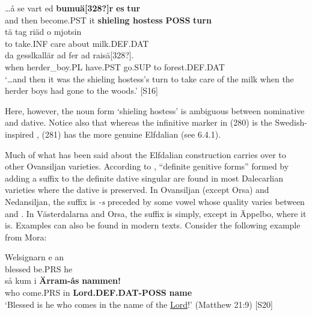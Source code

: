 
\ea\label{}
\gll …å  se  vart  ed  \textbf{bumuä[328?]r} \textbf{es} \textbf{tur}\\
and  then  become.PST  it  \textbf{shieling hostess} \textbf{POSS} \textbf{turn}\\
\gll tä  tag  riäd   o  mjotsin\\
to  take.INF  care  about  milk.DEF.DAT\\
\gll da  gesslkallär  ad  fer  ad  raisä[328?].\\
when  herder\_boy.PL  have.PST  go.SUP  to  forest.DEF.DAT\\
\glt ‘…and then it was the shieling hostess’s turn to take care of the milk when the herder boys had gone to the woods.’ [S16]
\z

Here, however, the noun form  ‘shieling hostess’ is ambiguous between nominative and dative. Notice also that whereas the infinitive marker in (280) is the Swedish-inspired , (281) has the more genuine Elfdalian  (see 6.4.1). 


Much of what has been said about the Elfdalian construction carries over to other Ovansiljan varieties. According to \citet[170]{Levander1928}, “definite genitive forms” formed by adding a suffix to the definite dative singular are found in most Dalecarlian varieties where the dative is preserved. In Ovansiljan (except Orsa) and Nedansiljan, the suffix is\textit{ {}-s} preceded by some vowel whose quality varies between  and . In Västerdalarna and Orsa, the suffix is simply, except in Äppelbo, where it is. Examples can also be found in modern texts. Consider the following example from Mora:


\ea\label{}
\gll Welsignarn  e  an\\
blessed  be.PRS  he\\
\gll så  kum  i  \textbf{Ärram-ås} \textbf{nammen!}\\
who  come.PRS  in  \textbf{Lord.DEF.DAT-POSS} \textbf{name}\\
\glt ‘Blessed is he who comes in the name of the \href{http://www.godrules.net/library/topics/topic1192.htm}{Lord}!’ (Matthew 21:9) [S20]
\z

